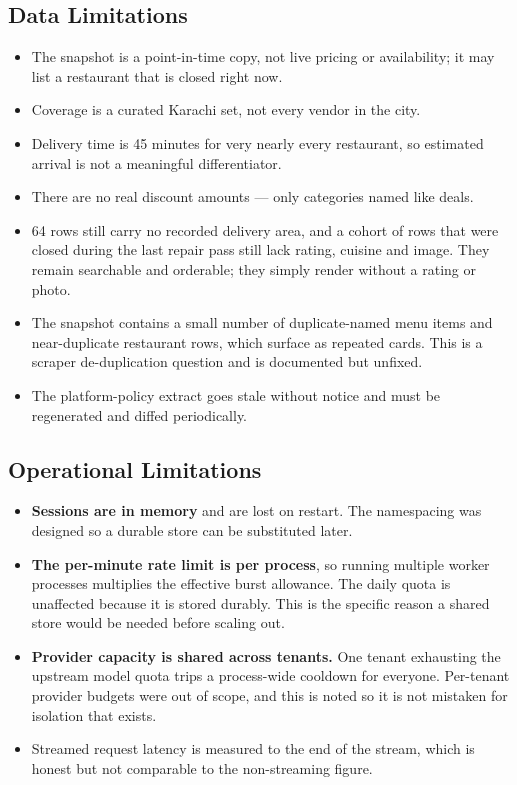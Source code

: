 \documentclass[11pt,a4paper]{article}
\begin{document}
\subsection{Data Limitations}

\begin{itemize}[itemsep=3pt,topsep=4pt]
\item The snapshot is a point-in-time copy, not live pricing or availability;
      it may list a restaurant that is closed right now.
\item Coverage is a curated Karachi set, not every vendor in the city.
\item Delivery time is 45 minutes for very nearly every restaurant, so
      estimated arrival is not a meaningful differentiator.
\item There are no real discount amounts --- only categories named like deals.
\item 64 rows still carry no recorded delivery area, and a cohort of rows that
      were closed during the last repair pass still lack rating, cuisine and
      image. They remain searchable and orderable; they simply render without a
      rating or photo.
\item The snapshot contains a small number of duplicate-named menu items and
      near-duplicate restaurant rows, which surface as repeated cards. This is
      a scraper de-duplication question and is documented but unfixed.
\item The platform-policy extract goes stale without notice and must be
      regenerated and diffed periodically.
\end{itemize}

\subsection{Operational Limitations}

\begin{itemize}[itemsep=3pt,topsep=4pt]
\item \textbf{Sessions are in memory} and are lost on restart. The namespacing
      was designed so a durable store can be substituted later.
\item \textbf{The per-minute rate limit is per process}, so running multiple
      worker processes multiplies the effective burst allowance. The daily
      quota is unaffected because it is stored durably. This is the specific
      reason a shared store would be needed before scaling out.
\item \textbf{Provider capacity is shared across tenants.} One tenant
      exhausting the upstream model quota trips a process-wide cooldown for
      everyone. Per-tenant provider budgets were out of scope, and this is
      noted so it is not mistaken for isolation that exists.
\item Streamed request latency is measured to the end of the stream, which is
      honest but not comparable to the non-streaming figure.
\end{itemize}
\end{document}
